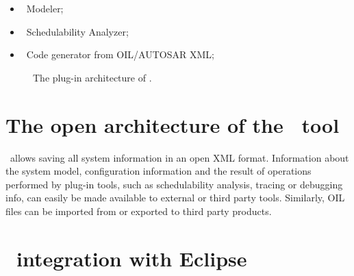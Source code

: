 \begin{itemize}
\item \rtd\ Modeler;
\item \rtd\ Schedulability Analyzer;
\item \rtd\ Code generator from OIL/AUTOSAR XML;
\end{itemize}
%
\begin{figure}
\caption{\label{fig:rtdruid-plugin-architecture}The plug-in architecture of \rtd.}
\end{figure}



\section{The open architecture of the \rtd\ tool}

%
\rtd\ allows saving all system information in an open XML
format. Information about the system model, configuration information
and the result of operations performed by plug-in tools, such as
schedulability analysis, tracing or debugging info, can easily be made
available to external or third party tools. Similarly, OIL files can
be imported from or exported to third party products.


\section{\rtd\ integration with Eclipse}

